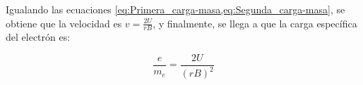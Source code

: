 Igualando las ecuaciones \cref{eq:Primera_carga-masa,eq:Segunda_carga-masa}, se obtiene que la velocidad es \( v = \frac{2 U}{r B} \), y finalmente, se llega a que la carga específica del electrón es:

\begin{equation}
    \frac{e}{m_{e}} = \frac{2 U}{(r B)^{2}}
    \label{eq:carga-masa}
\end{equation}









